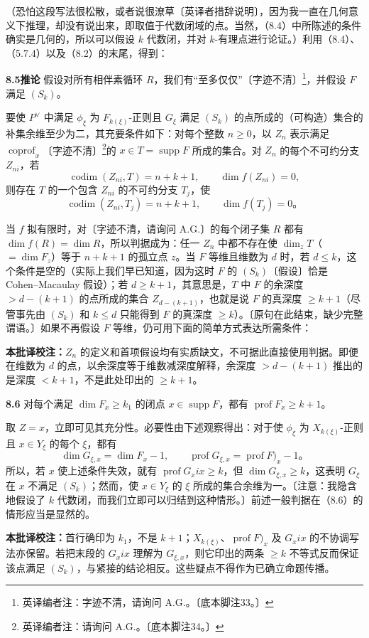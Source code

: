 \documentclass{ctexbook}
\newcommand{\codim}{\operatorname{codim}}
\newcommand{\prof}{\operatorname{prof}}
\newcommand{\coprof}{\operatorname{coprof}}
\newcommand{\supp}{\operatorname{supp}}
\newcommand{\ednote}[1]{\footnote{英译编者注：#1}}
\newcommand{\tnote}[1]{\par\smallskip\noindent\textbf{本批译校注：}#1\par\smallskip}
\newcommand{\entry}[2]{\par\bigskip\noindent\textbf{#1\quad #2}\quad}
\begin{document}
（恐怕这段写法很松散，或者说很潦草〔英译者措辞说明〕，因为我一直在几何意义下推理，却没有说出来，即取值于代数闭域的点。当然，（8.4）中所陈述的条件确实是几何的，所以可以假设 $k$ 代数闭，并对 $k$-有理点进行论证。）利用（8.4）、（5.7.4）以及（8.2）的末尾，得到：

\entry{8.5}{推论}
假设对所有相伴素循环 $R$，我们有“至多仅仅”〔字迹不清〕\ednote{字迹不清，请询问 A.G.。〔底本脚注33。〕}，并假设 $F$ 满足 $(S_k)$。

要使 $P^\vee$ 中满足 $\phi_\xi$ 为 $F_{k(\xi)}$-正则且 $G_\xi$ 满足 $(S_k)$ 的点所成的（可构造）集合的补集余维至少为二，其充要条件如下：对每个整数 $n\geq0$，以 $Z_n$ 表示满足 $\coprof_x$〔字迹不清〕\ednote{请询问 A.G.。〔底本脚注34。〕}的 $x\in T=\supp F$ 所成的集合。对 $Z_n$ 的每个不可约分支 $Z_{ni}$，若
\[
\codim(Z_{ni},T)=n+k+1,\qquad\dim f(Z_{ni})=0,
\]
则存在 $T$ 的一个包含 $Z_{ni}$ 的不可约分支 $T_j$，使
\[
\codim(Z_{ni},T_j)=n+k+1,\qquad\dim f(T_j)=0\text{。}
\]

当 $f$ 拟有限时，对〔字迹不清，请询问 A.G.〕的每个闭子集 $R$ 都有 $\dim f(R)=\dim R$，所以判据成为：任一 $Z_n$ 中都不存在使 $\dim_zT$（$=\dim F_z$）等于 $n+k+1$ 的孤立点 $z$。当 $F$ 等维且维数为 $d$ 时，若 $d\leq k$，这个条件是空的（实际上我们早已知道，因为这时 $F$ 的 $(S_k)$〔假设〕恰是 Cohen--Macaulay 假设）；若 $d\geq k+1$，其意思是，$T$ 中 $F$ 的余深度 $>d-(k+1)$ 的点所成的集合 $Z_{d-(k+1)}$，也就是说 $F$ 的真深度 $\geq k+1$（尽管事先由 $(S_k)$ 和 $k\leq d$ 只能得到 $F$ 的真深度 $\geq k$）。〔原句在此结束，缺少完整谓语。〕如果不再假设 $F$ 等维，仍可用下面的简单方式表达所需条件：
\tnote{$Z_n$ 的定义和首项假设均有实质缺文，不可据此直接使用判据。即便在维数为 $d$ 的点，以余深度等于维数减深度解释，余深度 $>d-(k+1)$ 推出的是深度 $<k+1$，不是此处印出的 $\geq k+1$。}

\entry{8.6}{}
对每个满足 $\dim F_x\geq k_1$ 的闭点 $x\in\supp F$，都有 $\prof F_x\geq k+1$。

取 $Z=x$，立即可见其充分性。必要性由下述观察得出：对于使 $\phi_\xi$ 为 $X_{k(\xi)}$-正则且 $x\in Y_\xi$ 的每个 $\xi$，都有
\[
\dim G_{\xi,x}=\dim F_x-1,\qquad
\prof G_{\xi,x}=\prof F)_x-1\text{。}
\]
所以，若 $x$ 使上述条件失效，就有 $\prof G_xix\geq k$，但 $\dim G_{\xi,x}\geq k$，这表明 $G_\xi$ 在 $x$ 不满足 $(S_k)$；然而，使 $x\in Y_\xi$ 的 $\xi$ 所成的集合余维为一。〔注意：我隐含地假设了 $k$ 代数闭，而我们立即可以归结到这种情形。〕前述一般判据在（8.6）的情形应当是显然的。
\tnote{首行确印为 $k_1$，不是 $k+1$；$X_{k(\xi)}$、$\prof F)_x$ 及 $G_xix$ 的不协调写法亦保留。若把末段的 $G_xix$ 理解为 $G_{\xi,x}$，则它印出的两条 $\geq k$ 不等式反而保证该点满足 $(S_k)$，与紧接的结论相反。这些疑点不得作为已确立命题传播。}
\backmatter
\end{document}
